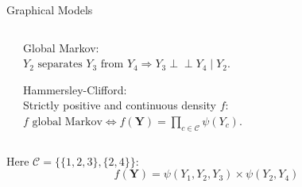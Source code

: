 \documentclass[11pt]{beamer}
\newcommand{\Ybf}{{\boldsymbol{Y}}}
\newcommand{\edgeunit}{1.5}
\newcommand{\bleu}[1]{\textcolor{Framableulight}{#1}}
\newcommand{\independent}{\perp \!\!\! \perp}
\begin{document}
 \begin{frame}{Graphical Models}
 \begin{columns}
 \begin{column}{0.4\linewidth}
 \end{column}
  \begin{column}{0.6\linewidth}
\bleu{Global Markov:}\\
  $ Y_2 \text{ separates } Y_3 \text{ from } Y_4  \Rightarrow Y_3\independent Y_4 \mid Y_2.$
  \bigskip
   \bigskip
   
 \bleu{Hammersley-Clifford:}\\
Strictly positive and {continuous} density $f$:
$ f\text{ global Markov} \iff \displaystyle f(\Ybf) = \prod_{c\in \mathcal{C} }\psi(Y_c).$
 \end{column}
  \end{columns}
  \bigskip
  
Here $\mathcal{C} =\big\{\{1, 2, 3\},\{2, 4\}\big\}$:
$$f(\Ybf) = \psi(Y_1,Y_2,Y_3)\times \psi(Y_2,Y_4)$$

 \end{frame}
\end{document}
